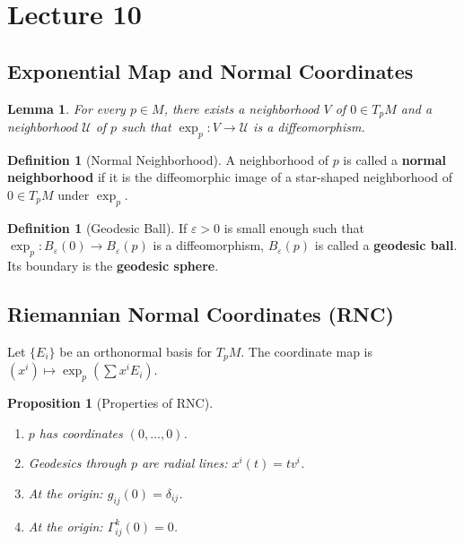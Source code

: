 \documentclass[11pt, a4paper]{article}
\theoremstyle{plain}
\newtheorem{lemma}[theorem]{Lemma}
\newtheorem{proposition}[theorem]{Proposition}
\theoremstyle{definition}
\newtheorem{definition}[theorem]{Definition}
\theoremstyle{remark}
\begin{document}
\newpage

\section{Lecture 10}

\subsection{Exponential Map and Normal Coordinates}

\begin{lemma}
For every $p \in M$, there exists a neighborhood $V$ of $0 \in T_pM$ and a neighborhood $\mathcal{U}$ of $p$ such that $\exp_p: V \to \mathcal{U}$ is a diffeomorphism.
\end{lemma}

\begin{definition}[Normal Neighborhood]
A neighborhood of $p$ is called a \textbf{normal neighborhood} if it is the diffeomorphic image of a star-shaped neighborhood of $0 \in T_pM$ under $\exp_p$.
\end{definition}

\begin{definition}[Geodesic Ball]
If $\varepsilon > 0$ is small enough such that $\exp_p: B_\varepsilon(0) \to B_\varepsilon(p)$ is a diffeomorphism, $B_\varepsilon(p)$ is called a \textbf{geodesic ball}. Its boundary is the \textbf{geodesic sphere}.
\end{definition}

\subsection*{Riemannian Normal Coordinates (RNC)}
Let $\{E_i\}$ be an orthonormal basis for $T_pM$. The coordinate map is $(x^i) \mapsto \exp_p(\sum x^i E_i)$.

\begin{proposition}[Properties of RNC]
\begin{enumerate}
    \item $p$ has coordinates $(0, \dots, 0)$.
    \item Geodesics through $p$ are radial lines: $x^i(t) = tv^i$.
    \item At the origin: $g_{ij}(0) = \delta_{ij}$.
    \item At the origin: $\Gamma_{ij}^k(0) = 0$.
\end{enumerate}
\end{proposition}
\end{document}
